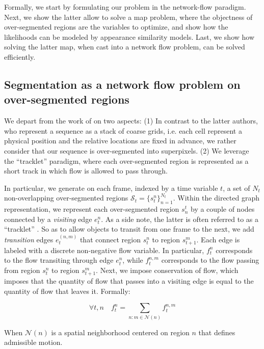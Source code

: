 Formally, we start by formulating our problem in the network-flow paradigm.
Next, we show the latter allow to solve a \gls{map} problem, where the objectness of over-segmented regions are the variables to optimize, and show how the likelihoods can be modeled by appearance similarity models.
Last, we show how solving the latter \gls{map}, when cast into a network flow problem, can be solved efficiently.

\subsection{Segmentation as a network flow problem on over-segmented regions}
We depart from the work of \cite{berclaz11} on two aspects: (1) In contrast to the latter authors, who represent a sequence as a stack of coarse grids, i.e. each cell represent a physical position and the relative locations are fixed in advance, we rather consider that our sequence is over-segmented into superpixels.
(2) We leverage the ``tracklet'' paradigm, where each over-segmented region is represented as a short track in which flow is allowed to pass through.


In particular, we generate on each frame, indexed by a time variable $t$, a set of $N_{t}$ non-overlapping over-segmented regions $\mathcal{S}_{t}=\{s_{t}^{n}\}_{n=1}^{N_{t}}$.
Within the directed graph representation, we represent each over-segmented region $s^{t}_{n}$ by a couple of nodes connected by a \textit{visiting} edge $e^{n}_{t}$.
As a side note, the latter is often referred to as a ``tracklet'' \cite{zhang08}.
So as to allow objects to transit from one frame to the next, we add \textit{transition} edges $e^{(n,m)}_{t}$ that connect region $s^{n}_{t}$ to region $s^{m}_{t+1}$.
Each edge is labeled with a discrete non-negative flow variable.
In particular, $f_{t}^{n}$ corresponds to the flow transiting through edge $e_{t}^{n}$, while $f_{t}^{n,m}$ corresponds to the flow passing from region $s_{t}^{n}$ to region $s_{t+1}^{m}$.
Next, we impose conservation of flow, which imposes that the quantity of flow that passes into a visiting edge is equal to the quantity of flow that leaves it. Formally:

\begin{equation}
  \label{eq:flow_conserv}
  \forall t,n \quad f_{t}^{n} = \sum_{n:m\in \mathcal{N}(n)}f_{t}^{n,m}
\end{equation}

When $\mathcal{N}(n)$ is a spatial neighborhood centered on region $n$ that defines admissible motion.

